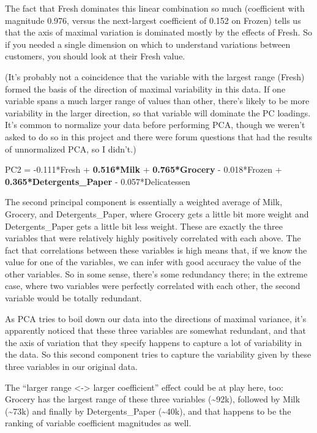 \documentclass{article}
\begin{document}
The fact that Fresh dominates this linear combination so much
(coefficient with magnitude 0.976, versus the next-largest coefficient
of 0.152 on Frozen) tells us that the axis of maximal variation is
dominated mostly by the effects of Fresh. So if you needed a single
dimension on which to understand variations between customers, you
should look at their Fresh value.

(It's probably not a coincidence that the variable with the largest
range (Fresh) formed the basis of the direction of maximal variability
in this data. If one variable spans a much larger range of values than
other, there's likely to be more variability in the larger direction, so
that variable will dominate the PC loadings. It's common to normalize
your data before performing PCA, though we weren't asked to do so in
this project and there were forum questions that had the results of
unnormalized PCA, so I didn't.)

PC2 = -0.111*Fresh + \textbf{0.516*Milk} + \textbf{0.765*Grocery} -
0.018*Frozen + \textbf{0.365*Detergents\_Paper} - 0.057*Delicatessen

The second principal component is essentially a weighted average of
Milk, Grocery, and Detergents\_Paper, where Grocery gets a little bit
more weight and Detergents\_Paper gets a little bit less weight. These
are exactly the three variables that were relatively highly positively
correlated with each above. The fact that correlations between these
variables is high means that, if we know the value for one of the
variables, we can infer with good accuracy the value of the other
variables. So in some sense, there's some redundancy there; in the
extreme case, where two variables were perfectly correlated with each
other, the second variable would be totally redundant.

As PCA tries to boil down our data into the directions of maximal
variance, it's apparently noticed that these three variables are
somewhat redundant, and that the axis of variation that they specify
happens to capture a lot of variability in the data. So this second
component tries to capture the variability given by these three
variables in our original data.

The ``larger range \textless{}-\textgreater{} larger coefficient''
effect could be at play here, too: Grocery has the largest range of
these three variables (\textasciitilde{}92k), followed by Milk
(\textasciitilde{}73k) and finally by Detergents\_Paper
(\textasciitilde{}40k), and that happens to be the ranking of variable
coefficient magnitudes as well.
\end{document}
